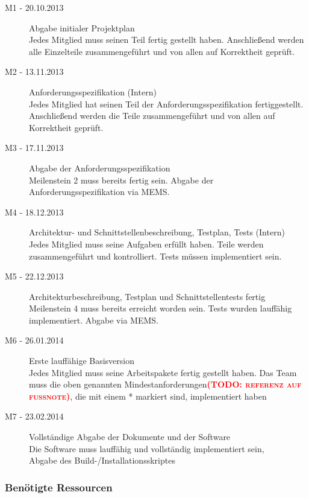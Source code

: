 \documentclass[fontsize=12pt,paper=a4,twoside]{scrartcl}
\newcommand{\todo}[1]{\textbf{\textsc{\textcolor{red}{(TODO: #1)}}}}
\begin{document}
\begin{description}
\item[M1 - 20.10.2013] Abgabe initialer Projektplan\\
Jedes Mitglied muss seinen Teil fertig gestellt haben. Anschließend werden alle Einzelteile zusammengeführt und von allen auf Korrektheit geprüft.
\item[M2 - 13.11.2013] Anforderungsspezifikation (Intern) \\
Jedes Mitglied hat seinen Teil der Anforderungsspezifikation fertiggestellt. Anschließend werden die Teile zusammengeführt und von allen auf Korrektheit geprüft.
\item[M3 - 17.11.2013] Abgabe der Anforderungsspezifikation \\
Meilenstein 2 muss bereits fertig sein. Abgabe der Anforderungsspezifikation via MEMS.
\item[M4 - 18.12.2013] Architektur- und Schnittstellenbeschreibung, Testplan, Tests (Intern)\\
Jedes Mitglied muss seine Aufgaben erfüllt haben. Teile werden zusammengeführt und kontrolliert. Tests müssen implementiert sein.
\item[M5 - 22.12.2013] Architekturbeschreibung, Testplan und Schnittstellentests fertig\\
Meilenstein 4 muss bereits erreicht worden sein. Tests wurden lauffähig implementiert. Abgabe via MEMS.
\item[M6 - 26.01.2014] Erste lauffähige Basisversion\\
Jedes Mitglied muss seine Arbeitspakete fertig gestellt haben. Das Team muss die oben genannten Mindestanforderungen\todo{referenz auf fußnote}, die mit einem * markiert sind, implementiert haben
\item[M7 - 23.02.2014] Vollständige Abgabe der Dokumente und der Software \\
Die Software muss lauffähig und vollständig implementiert sein, \\
Abgabe des Build-/Installationsskriptes
\end{description}

\subsubsection{Benötigte Ressourcen}
\end{document}
